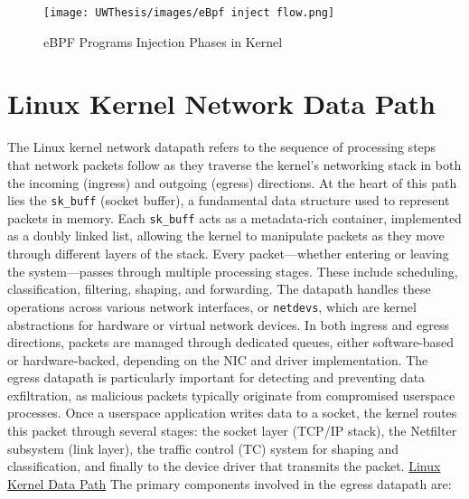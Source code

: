 \documentclass [11pt, proquest] {uwthesis}[2020/02/24]
\begin{document}
\label{sec:ebpf-inject-flow}
\begin{figure}[h]
\texttt{[image: UWThesis/images/eBpf inject flow.png]}
\caption{eBPF Programs Injection Phases in Kernel}
\end{figure}

\newpage
\section{Linux Kernel Network Data Path}
The Linux kernel network datapath refers to the sequence of processing steps that network packets follow as they traverse the kernel’s networking stack in both the incoming (ingress) and outgoing (egress) directions. At the heart of this path lies the \texttt{sk\_buff} (socket buffer), a fundamental data structure used to represent packets in memory. Each \texttt{sk\_buff} acts as a metadata-rich container, implemented as a doubly linked list, allowing the kernel to manipulate packets as they move through different layers of the stack. Every packet—whether entering or leaving the system—passes through multiple processing stages. These include scheduling, classification, filtering, shaping, and forwarding. The datapath handles these operations across various network interfaces, or \texttt{netdevs}, which are kernel abstractions for hardware or virtual network devices. In both ingress and egress directions, packets are managed through dedicated queues, either software-based or hardware-backed, depending on the NIC and driver implementation. The egress datapath is particularly important for detecting and preventing data exfiltration, as malicious packets typically originate from compromised userspace processes. Once a userspace application writes data to a socket, the kernel routes this packet through several stages: the socket layer (TCP/IP stack), the Netfilter subsystem (link layer), the traffic control (TC) system for shaping and classification, and finally to the device driver that transmits the packet.
\hyperref[sec:kernel-network-datapath]{Linux Kernel Data Path}
The primary components involved in the egress datapath are:
\end{document}
